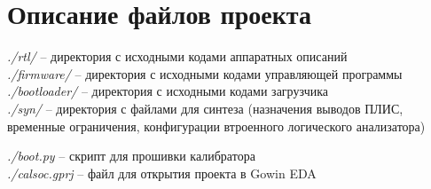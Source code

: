 \chapter{Описание файлов проекта}\label{appendix-extra-examples}%

\noindent \emph{./rtl/} -- директория с исходными кодами аппаратных описаний\\
\noindent \emph{./firmware/} -- директория с исходными кодами управляющей программы\\
\noindent \emph{./bootloader/} -- директория с исходными кодами загрузчика\\
\noindent \emph{./syn/} -- директория с файлами для синтеза (назначения выводов ПЛИС, временные ограничения, конфигурации втроенного
логического анализатора)

\noindent \emph{./boot.py} -- скрипт для прошивки калибратора\\
\noindent \emph{./calsoc.gprj} -- файл для открытия проекта в Gowin EDA\\
